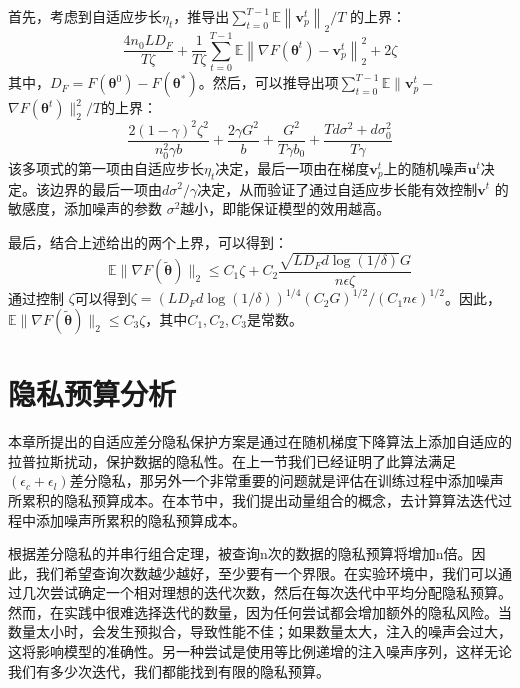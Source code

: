 首先，考虑到自适应步长$\eta_{t}$，推导出$\sum_{t=0}^{T-1} \mathbb{E}\left\|\mathbf{v}_{p}^{t}\right\|_{2} / T$ 的上界：
$$
\frac{4 n_{0} L D_{F}}{T \zeta}+\frac{1}{T \zeta} \sum_{t=0}^{T-1} \mathbb{E}\left\|\nabla F\left(\boldsymbol{\theta}^{t}\right)-\mathbf{v}_{p}^{t}\right\|_{2}^{2}+2 \zeta
$$
其中，$D_{F}=F\left(\boldsymbol{\theta}^{0}\right)-F\left(\boldsymbol{\theta}^{*}\right)$。然后，可以推导出项$\sum_{t=0}^{T-1} \mathbb{E} \| \mathbf{v}_{p}^{t}-$ $\nabla F\left(\boldsymbol{\theta}^{t}\right) \|_{2}^{2} / T$的上界：
$$
\frac{2(1-\gamma)^{2} \zeta^{2}}{n_{0}^{2} \gamma b}+\frac{2 \gamma G^{2}}{b}+\frac{G^{2}}{T \gamma b_{0}}+\frac{T d \sigma^{2}+d \sigma_{0}^{2}}{T \gamma}
$$
该多项式的第一项由自适应步长$\eta_{t}$决定，最后一项由在梯度$\mathbf{v}_{p}^{t}$上的随机噪声$\mathbf{u}^{t}$决定。该边界的最后一项由$d \sigma^{2} / \gamma$决定，从而验证了通过自适应步长能有效控制$\mathbf{v}^{t}$ 的敏感度，添加噪声的参数 $\sigma^{2}$越小，即能保证模型的效用越高。

最后，结合上述给出的两个上界，可以得到：
$$
\mathbb{E}\|\nabla F(\widetilde{\boldsymbol{\theta}})\|_{2} \leq C_{1} \zeta+C_{2} \frac{\sqrt{L D_{F} d \log (1 / \delta)} G}{n \epsilon \zeta}
$$
通过控制 $\zeta$可以得到$\zeta=\left(L D_{F} d \log (1 / \delta)\right)^{1 / 4}\left(C_{2} G\right)^{1 / 2} /\left(C_{1} n \epsilon\right)^{1 / 2}$。因此，$\mathbb{E}\|\nabla F(\widetilde{\boldsymbol{\theta}})\|_{2} \leq C_{3} \zeta$，其中$C_{1}, C_{2}, C_{3}$是常数。

\section{隐私预算分析}
本章所提出的自适应差分隐私保护方案是通过在随机梯度下降算法上添加自适应的拉普拉斯扰动，保护数据的隐私性。在上一节我们已经证明了此算法满足$\left(\epsilon_{c}+\epsilon_{l}\right)$差分隐私，那另外一个非常重要的问题就是评估在训练过程中添加噪声所累积的隐私预算成本。在本节中，我们提出动量组合的概念，去计算算法迭代过程中添加噪声所累积的隐私预算成本。

根据差分隐私的并串行组合定理，被查询n次的数据的隐私预算将增加n倍。因此，我们希望查询次数越少越好，至少要有一个界限。在实验环境中，我们可以通过几次尝试确定一个相对理想的迭代次数，然后在每次迭代中平均分配隐私预算。然而，在实践中很难选择迭代的数量，因为任何尝试都会增加额外的隐私风险。当数量太小时，会发生预拟合，导致性能不佳；如果数量太大，注入的噪声会过大，这将影响模型的准确性。另一种尝试是使用等比例递增的注入噪声序列，这样无论我们有多少次迭代，我们都能找到有限的隐私预算。

